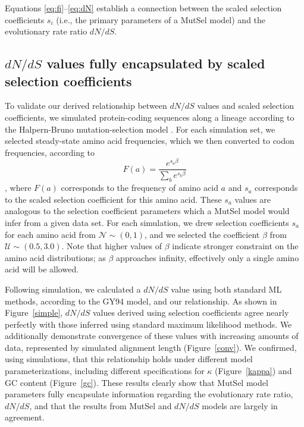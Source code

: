\documentclass[11pt]{article}
\begin{document}
Equations \eqref{eq:fi}--\eqref{eq:dN} establish a connection between the scaled selection coefficients $s_i$ (i.e., the primary parameters of a MutSel model) and the evolutionary rate ratio $dN/dS$. 


\subsection*{$dN/dS$ values fully encapsulated by scaled selection coefficients}

To validate our derived relationship between $dN/dS$ values and scaled selection coefficients, we simulated protein-coding sequences along a lineage according to the Halpern-Bruno mutation-selection model \cite{HalpernBruno1998}. For each simulation set, we selected steady-state amino acid frequencies, which we then converted to codon frequencies, according to \begin{equation} F(a) = \frac{e^{s_a\beta}}{\sum_b e^{s_b\beta}} \end{equation}, where $F(a)$ corresponds to the frequency of amino acid $a$ and $s_a$ corresponds to the scaled selection coefficient for this amino acid. These $s_a$ values are analogous to the selection coefficient parameters which a MutSel model would infer from a given data set. For each simulation, we drew selection coefficients $s_a$ for each amino acid from $\mathcal{N} \sim (0, 1)$, and we selected the coefficient $\beta$ from $\mathcal{U} \sim (0.5, 3.0)$. Note that higher values of $\beta$ indicate stronger constraint on the amino acid distributions; as $\beta$ approaches infinity, effectively only a single amino acid will be allowed. 

Following simulation, we calculated a $dN/dS$ value using both standard ML methods, according to the GY94 \cite{GoldmanYang1994} model, and our relationship. As shown in Figure~\ref{simple}, $dN/dS$ values derived using selection coefficients agree nearly perfectly with those inferred using standard maximum likelihood methods. We additionally demonstrate convergence of these values with increasing amounts of data, represented by simulated alignment length (Figure~\ref{conv}). We confirmed, using simulations, that this relationship holds under different model parameterizations, including different specifications for $\kappa$ (Figure~\ref{kappa}) and GC content (Figure~\ref{gc}). These results clearly show that MutSel model parameters fully encapsulate information regarding the evolutionary rate ratio, $dN/dS$, and that the results from MutSel and $dN/dS$ models are largely in agreement.
\end{document}
